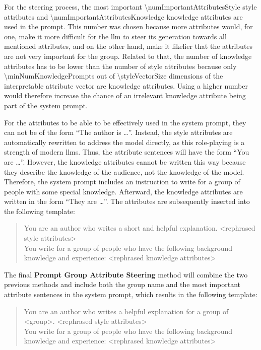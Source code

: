 For the steering process, the most important \num{\numImportantAttributesStyle} style attributes and \num{\numImportantAttributesKnowledge} knowledge attributes are used in the prompt. This number was chosen because more attributes would, for one, make it more difficult for the \ac{llm} to steer its generation towards all mentioned attributes, and on the other hand, make it likelier that the attributes are not very important for the group. Related to that, the number of knowledge attributes has to be lower than the number of style attributes because only \num{\minNumKnowledgePrompts} out of \num{\styleVectorSize} dimensions of the interpretable attribute vector are knowledge attributes. Using a higher number would therefore increase the chance of an irrelevant knowledge attribute being part of the system prompt.

For the attributes to be able to be effectively used in the system prompt, they can not be of the form \enquote{The author is \ldots}. Instead, the style attributes are automatically rewritten to address the model directly, as this role-playing is a strength of modern \aclp{llm}. %
Thus, the attribute sentences will have the form \enquote{You are \ldots}.
However, the knowledge attributes cannot be written this way because they describe the knowledge of the audience, not the knowledge of the model. Therefore, the system prompt includes an instruction to write for a group of people with some special knowledge. Afterward, the knowledge attributes are written in the form \enquote{They are \ldots}. The attributes are subsequently inserted into the following template:
\begin{quote} %
  You are an author who writes a short and helpful explanation. \newline
  <rephrased style attributes> \\[5pt]
  You write for a group of people who have the following background knowledge and experience: \newline
  <rephrased knowledge attributes>
\end{quote}

The final \textbf{Prompt Group Attribute Steering} method will combine the two previous methods and include both the group name and the most important attribute sentences in the system prompt, which results in the following template:

\begin{quote} %
  You are an author who writes a helpful explanation for a group of <group>. \newline
  <rephrased style attributes> \\[5pt]
  You write for a group of people who have the following background knowledge and experience: \newline
  <rephrased knowledge attributes>
\end{quote}


